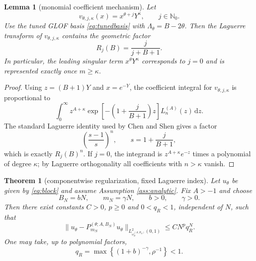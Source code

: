 \documentclass[11pt]{article}
\newtheorem{lemma}{Lemma}
\newtheorem{theorem}{Theorem}
\newcommand{\dd}{\,\mathrm{d}}
\newcommand{\Lag}{L}
\begin{document}
\begin{lemma}[monomial coefficient mechanism]\label{lem:monomial-mechanism}
Let
\[
    v_{\theta,j,\kappa}(x)=x^{\theta+j}Y^\kappa,
    \qquad j\in\mathbb{N}_0.
\]
Use the tuned GLOF basis \eqref{eq:tunedbasis} with $\Lambda_\theta=B-2\theta$.  Then the Laguerre transform of $v_{\theta,j,\kappa}$ contains the geometric factor
\begin{equation}\label{eq:Rj}
    R_j(B)=\frac{j}{j+B+1}.
\end{equation}
In particular, the leading singular term $x^\theta Y^\kappa$ corresponds to $j=0$ and is represented exactly once $m\ge\kappa$.
\end{lemma}

\begin{proof}
Using $z=(B+1)Y$ and $x=e^{-Y}$, the coefficient integral for $v_{\theta,j,\kappa}$ is proportional to
\[
    \int_0^\infty z^{A+\kappa}
    \exp\left[-\left(1+\frac{j}{B+1}\right)z\right]
    \Lag_n^{(A)}(z)\dd z.
\]
The standard Laguerre identity used by Chen and Shen gives a factor
\[
    \left(\frac{s-1}{s}\right)^n,
    \qquad s=1+\frac{j}{B+1},
\]
which is exactly $R_j(B)^n$.  If $j=0$, the integrand is $z^{A+\kappa}e^{-z}$ times a polynomial of degree $\kappa$; by Laguerre orthogonality all coefficients with $n>\kappa$ vanish.
\end{proof}

\begin{theorem}[componentwise regularization, fixed Laguerre index]\label{thm:regularization-fixedA}
Let $u_\theta$ be given by \eqref{eq:block} and assume Assumption \ref{ass:analytic}.  Fix $A>-1$ and choose
\begin{equation}\label{eq:params-reg}
    B_N=bN,
    \qquad m_N=\gamma N,
    \qquad b>0,
    \qquad \gamma>0.
\end{equation}
Then there exist constants $C>0$, $p\ge0$ and $0<q_R<1$, independent of $N$, such that
\begin{equation}\label{eq:reg-exp}
    \|u_\theta-P_{m_N}^{(\theta;A,B_N)}u_\theta\|_{L^2_{\omega_\theta^{(A,B_N)}}(0,1)}
    \le C N^p q_R^N.
\end{equation}
One may take, up to polynomial factors,
\begin{equation}\label{eq:qRsimple}
    q_R=\max\left\{(1+b)^{-\gamma},\rho^{-1}\right\}<1.
\end{equation}
\end{theorem}
\end{document}
